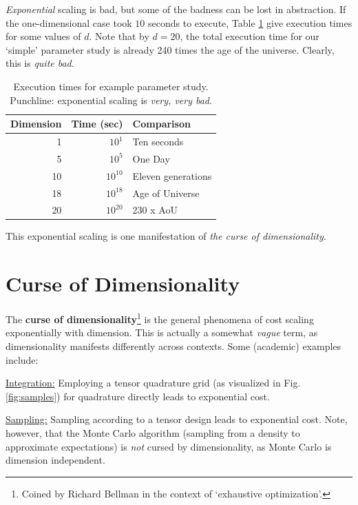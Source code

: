 \documentclass{article}
\begin{document}
\emph{Exponential} scaling is bad, but some of the badness can be lost in
abstraction. If the one-dimensional case took $10$ seconds to execute, Table
\ref{tab:exponential} give execution times for some values of $d$. Note that by
$d=20$, the total execution time for our `simple' parameter study is already 240
times the age of the universe. Clearly, this is \emph{quite bad}.

\begin{table}[!ht]
  \centering
  \begin{tabular}{r|r|l}
  \hline
  Dimension & Time (sec) & Comparison\\
  \hline
  1 & $10^{1}$ & Ten seconds\\
  \hline
  5 & $10^{5}$ & One Day\\
  \hline
  10 & $10^{10}$ & Eleven generations\\
  \hline
  18 & $10^{18}$ & Age of Universe\\
  \hline
  20 & $10^{20}$ & 230 x AoU\\
  \hline
  \end{tabular}
  \caption{Execution times for example parameter study. Punchline: exponential
    scaling is \emph{very, very bad}.}
  \label{tab:exponential}
\end{table}

This exponential scaling is one manifestation of \emph{the curse of
  dimensionality}.

\section{Curse of Dimensionality}
The \textbf{curse of dimensionality}\footnote{Coined by Richard Bellman in the
  context of `exhaustive optimization'.} is the general phenomena of cost
scaling exponentially with dimension. This is actually a somewhat \emph{vague}
term, as dimensionality manifests differently across
contexts.\cite{donoho2000high} Some (academic) examples include:

\bigskip\noindent\underline{Integration:} Employing a tensor quadrature grid (as
visualized in Fig. \ref{fig:samples}) for quadrature directly leads to
exponential cost.

\bigskip\noindent\underline{Sampling:} Sampling according to a tensor design
leads to exponential cost. Note, however, that the Monte Carlo algorithm
(sampling from a density to approximate expectations) is \emph{not} cursed by
dimensionality, as Monte Carlo is dimension
independent.\cite{owen2013montecarlo}
\end{document}
